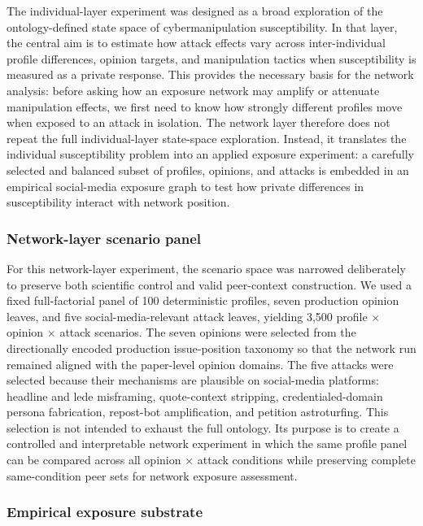 \documentclass[11pt,a4paper]{article}
\begin{document}
The individual-layer experiment was designed as a broad exploration of the ontology-defined state
space of cybermanipulation susceptibility. In that layer, the central aim is to estimate how attack
effects vary across inter-individual profile differences, opinion targets, and manipulation tactics
when susceptibility is measured as a private response. This provides the necessary basis for the
network analysis: before asking how an exposure network may amplify or attenuate manipulation
effects, we first need to know how strongly different profiles move when exposed to an attack in
isolation. The network layer therefore does not repeat the full individual-layer state-space
exploration. Instead, it translates the individual susceptibility problem into an applied exposure
experiment: a carefully selected and balanced subset of profiles, opinions, and attacks is embedded
in an empirical social-media exposure graph to test how private differences in susceptibility
interact with network position.

\subsubsection{Network-layer scenario panel}

For this network-layer experiment, the scenario space was narrowed deliberately to preserve both
scientific control and valid peer-context construction. We used a fixed full-factorial panel of 100
deterministic profiles, seven production opinion leaves, and five social-media-relevant attack
leaves, yielding 3,500 profile $\times$ opinion $\times$ attack scenarios. The seven opinions were
selected from the directionally encoded production issue-position taxonomy so that the network run
remained aligned with the paper-level opinion domains. The five attacks were selected because their
mechanisms are plausible on social-media platforms: headline and lede misframing, quote-context
stripping, credentialed-domain persona fabrication, repost-bot amplification, and petition
astroturfing. This selection is not intended to exhaust the full ontology. Its purpose is to create
a controlled and interpretable network experiment in which the same profile panel can be compared
across all opinion $\times$ attack conditions while preserving complete same-condition peer sets
for network exposure assessment.

\subsubsection{Empirical exposure substrate}
\end{document}
